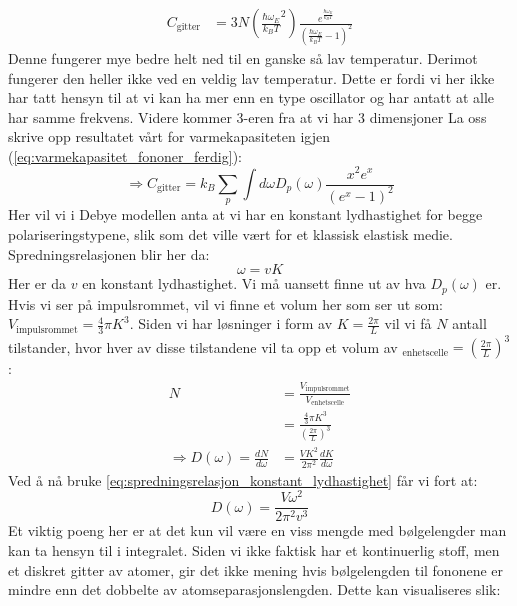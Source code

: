\documentclass{article}
\begin{document}
\begin{align}
    C_{\text{gitter}} &= 3N \left(\frac{\hbar \omega_E}{k_B T}^2\right) \frac{e^{\frac{\hbar \omega_E}{k_B T}}}{\left(\frac{\hbar \omega_E}{k_B T} - 1\right)^2}
\end{align}
Denne fungerer mye bedre helt ned til en ganske så lav temperatur. Derimot fungerer den heller ikke ved en veldig lav temperatur. Dette er fordi vi her ikke har tatt hensyn til at vi kan ha mer enn en type oscillator og har antatt at alle har samme frekvens. Videre kommer 3-eren fra at vi har 3 dimensjoner
La oss skrive opp resultatet vårt for varmekapasiteten igjen (\ref{eq:varmekapasitet_fononer_ferdig}):
\begin{equation}
    \Rightarrow C_{\text{gitter}} = k_B \sum_p \int d\omega D_p(\omega) \frac{x^2e^x}{\left(e^x-1\right)^2}
\end{equation}
Her vil vi i Debye modellen anta  at vi har en konstant lydhastighet for begge polariseringstypene, slik som det ville vært for et klassisk elastisk medie. Spredningsrelasjonen blir her da:
\begin{equation}
\label{eq:spredningsrelasjon_konstant_lydhastighet}
    \omega = v K
\end{equation}
Her er da $v$ en konstant lydhastighet. Vi må uansett finne ut av hva $D_p(\omega)$ er.
Hvis vi ser på impulsrommet, vil vi finne et volum her som ser ut som: $V_{\text{impulsrommet}} = \frac{4}{3} \pi K^3$. Siden vi har løsninger i form av $K = \frac{2\pi}{L}$ vil vi få $N$ antall tilstander, hvor hver av disse tilstandene vil ta opp et volum av $_{\text{enhetscelle}} = \left(\frac{2 \pi}{L}\right)^3$:
\begin{align}
    N &= \frac{V_{\text{impulsrommet}}}{V_{\text{enhetscelle}}}\\
    &= \frac{\frac{4}{3} \pi K^3}{\left(\frac{2 \pi}{L}\right)^3} \\
\Rightarrow D(\omega) = \frac{dN}{d \omega} &=\frac{V K^2}{ 2 \pi^2} \frac{dK}{d\omega}
\label{eq:antall_tilstander_i_debye}
\end{align}
Ved å nå bruke \ref{eq:spredningsrelasjon_konstant_lydhastighet} får vi fort at:
\begin{equation}
    D(\omega) = \frac{V \omega^2}{2 \pi^2 v^3}
\end{equation}
Et viktig poeng her er at det kun vil være en viss mengde med bølgelengder man kan ta hensyn til i integralet. Siden vi ikke faktisk har et kontinuerlig stoff, men et diskret gitter av atomer, gir det ikke mening hvis bølgelengden til fononene er mindre enn det dobbelte av atomseparasjonslengden. Dette kan visualiseres slik:
\end{document}

